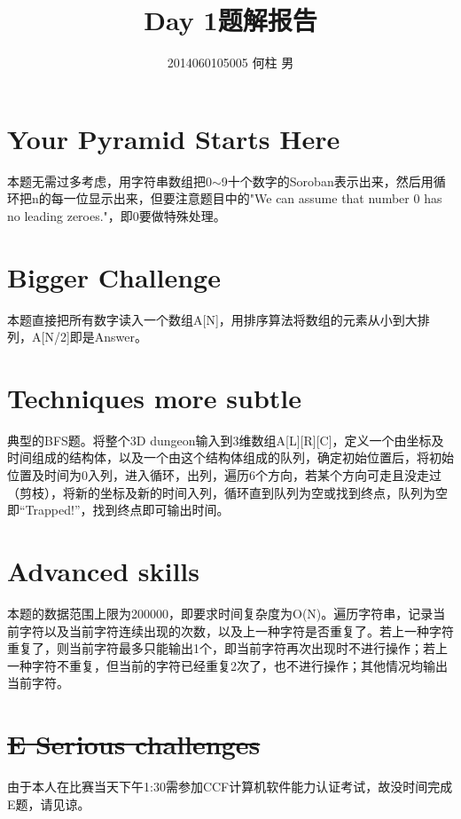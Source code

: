 \documentclass[a4paper]{ctexart}
\title{Day 1题解报告}
\author{2014060105005{ }何柱{ }男}
\begin{document}
	\maketitle
	\appendix
	\section{Your Pyramid Starts Here}
	本题无需过多考虑，用字符串数组把0$\sim$9十个数字的Soroban表示出来，然后用循环把n的每一位显示出来，但要注意题目中的"We can assume that number 0 has no leading zeroes."，即0要做特殊处理。
	\section{Bigger Challenge}
	本题直接把所有数字读入一个数组A[N]，用排序算法将数组的元素从小到大排列，A[N/2]即是Answer。
	\section{Techniques more subtle}
	典型的BFS题。将整个3D dungeon输入到3维数组A[L][R][C]，定义一个由坐标及时间组成的结构体，以及一个由这个结构体组成的队列，确定初始位置后，将初始位置及时间为0入列，进入循环，出列，遍历6个方向，若某个方向可走且没走过（剪枝），将新的坐标及新的时间入列，循环直到队列为空或找到终点，队列为空即“Trapped!”，找到终点即可输出时间。
	\section{Advanced skills}
	本题的数据范围上限为200000，即要求时间复杂度为O(N)。遍历字符串，记录当前字符以及当前字符连续出现的次数，以及上一种字符是否重复了。若上一种字符重复了，则当前字符最多只能输出1个，即当前字符再次出现时不进行操作；若上一种字符不重复，但当前的字符已经重复2次了，也不进行操作；其他情况均输出当前字符。
	\section*{\sout{E{ }{ }{ }Serious challenges}}
	由于本人在比赛当天下午1:30需参加CCF计算机软件能力认证考试，故没时间完成E题，请见谅。
\end{document}
